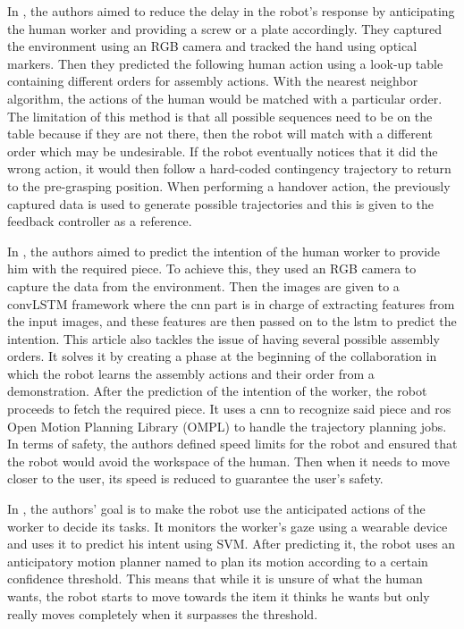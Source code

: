 In \textcite{Maeda2016}, the authors aimed to reduce the delay in the robot's response by anticipating the human worker and providing a screw or a plate accordingly. They captured the environment using an RGB camera and tracked the hand using optical markers. Then they predicted the following human action using a look-up table containing different orders for assembly actions. With the nearest neighbor algorithm, the actions of the human would be matched with a particular order. The limitation of this method is that all possible sequences need to be on the table because if they are not there, then the robot will match with a different order which may be undesirable. If the robot eventually notices that it did the wrong action, it would then follow a hard-coded contingency trajectory to return to the pre-grasping position. When performing a handover action, the previously captured data is used to generate possible trajectories and this is given to the feedback controller as a reference.

In \textcite{Zhang2022}, the authors aimed to predict the intention of the human worker to provide him with the required piece. To achieve this, they used an RGB camera to capture the data from the environment. Then the images are given to a convLSTM framework where the \acs{cnn} part is in charge of extracting features from the input images, and these features are then passed on to the \acs{lstm} to predict the intention. This article also tackles the issue of having several possible assembly orders. It solves it by creating a phase at the beginning of the collaboration in which the robot learns the assembly actions and their order from a demonstration. After the prediction of the intention of the worker, the robot proceeds to fetch the required piece. It uses a \acs{cnn} to recognize said piece and \acs{ros} Open Motion Planning Library (OMPL) to handle the trajectory planning jobs. In terms of safety, the authors defined speed limits for the robot and ensured that the robot would avoid the workspace of the human. Then when it needs to move closer to the user, its speed is reduced to guarantee the user's safety.

In \textcite{Huang2016}, the authors' goal is to make the robot use the anticipated actions of the worker to decide its tasks. It monitors the worker's gaze using a wearable device and uses it to predict his intent using SVM. After predicting it, the robot uses an anticipatory motion planner named  to plan its motion according to a certain confidence threshold. This means that while it is unsure of what the human wants, the robot starts to move towards the item it thinks he wants but only really moves completely when it surpasses the threshold.


